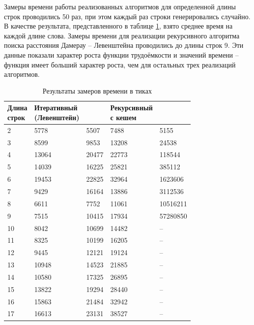 Замеры времени работы реализованных алгоритмов для определенной длины строк проводились 50 раз, при этом каждый раз строки генерировались случайно. В качестве результата, представленного в таблице \ref{tab:time}, взято среднее время на каждой длине слова. Замеры времени для реализации рекурсивного алгоритма поиска расстояния Дамерау -- Левенштейна проводились до длины строк 9. Эти данные показали характер роста функции трудоёмкости и значений времени -- функция имеет больший характер роста, чем для остальных трех реализаций алгоритмов.
\pagebreak
\begin{table}[h]
	\begin{center}
		\caption{\label{tab:time}Результаты замеров времени в тиках}
	\begin{tabular}{|l|l|l|l|l|}
		\hline \specialcell{Длина\\строк} & \specialcell{Итеративный\\(Левенштейн)} &
		 \specialcell{Итеративный} & \specialcell{Рекурсивный \\с кешем} & \specialcell{Рекурсивный} \\\hline
		2   & 5778   & 5507   & 7488    & 5155     \\\hline
		3   & 8599   & 9853   & 13208   & 24538    \\\hline
		4   & 13064  & 20477  & 22773   & 118544   \\\hline
		5   & 14039  & 16225  & 25821   & 385112   \\\hline
		6   & 19453  & 22825  & 32964   & 1623606  \\\hline
		7   & 9429   & 16164  & 13886   & 3112536  \\\hline
		8   & 6611   & 7752   & 11061   & 10516211 \\\hline
		9   & 7515   & 10415  & 17934   & 57280850 \\\hline
		10  & 8042   & 10699  & 14482   & --       \\\hline
		11  & 8325   & 10199  & 16205   & --        \\\hline
		12  & 9445   & 12121  & 19124   & --      \\\hline
		13  & 10948  & 14523  & 21885   & --        \\\hline
		14  & 10580  & 17325  & 26895   & --        \\\hline
		15  & 13822  & 19294  & 28440   & --        \\\hline
		16  & 15863  & 21484  & 32942   & --        \\\hline
		17  & 16613  & 23131  & 38527   & --        \\\hline

\end{tabular}
\end{center}
\end{table}
